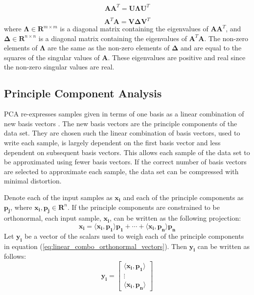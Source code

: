 \documentclass[conference]{IEEEtran}
\begin{document}
    \begin{equation}
         \mathbf{AA}^{T} = \mathbf{U\Lambda}\mathbf{U}^T
    \label{eq:aatranspose}
    \end{equation}

    \begin{equation}
         \mathbf{A}^T\mathbf{A} = \mathbf{V\Delta}\mathbf{V}^T
    \label{eq:atransposea}
    \end{equation}
    where $\mathbf{\Lambda} \in \mathbf{R}^{m \times m}$ is a diagonal matrix containing the eigenvalues of $\mathbf{AA}^{T}$, and $\mathbf{\Delta} \in \mathbf{R}^{n \times n}$ is a diagonal matrix containing the eigenvalues of $\mathbf{A}^T\mathbf{A}$. The non-zero elements of $\mathbf{\Lambda}$ are the same as the non-zero elements of $\mathbf{\Delta}$ and are equal to the squares of the singular values of $\mathbf{A}$. These eigenvalues are positive and real since the non-zero singular values are real.
    
    \subsection{Principle Component Analysis}
    
    PCA re-expresses samples given in terms of one basis as a linear combination of new basis vectors \cite{shlens_2014_tutorial}. The new basis vectors are the principle components of the data set. They are chosen such the linear combination of basis vectors, used to write each sample, is largely dependent on the first basis vector and less dependent on subsequent basis vectors. This allows each sample of the data set to be approximated using fewer basis vectors. If the correct number of basis vectors are selected to approximate each sample, the data set can be compressed with minimal distortion.
    
    Denote each of the input samples as $\mathbf{x_i}$ and each of the principle components as $\mathbf{p_j}$, where $\mathbf{x_i}, \mathbf{p_j} \in \mathbf{R}^{n}$. If the principle components are constrained to be orthonormal, each input sample, $\mathbf{x_i}$, can be written as the following projection:
    \begin{equation}
    		\mathbf{x_i} = \langle \mathbf{x_i}, \mathbf{p_1} \rangle \mathbf{p_1} + \cdots + \langle \mathbf{x_i}, \mathbf{p_n} \rangle \mathbf{p_n}
    \label{eq:linear_combo_orthonormal_vectors}
    \end{equation}
    Let $\mathbf{y_i}$ be a vector of the scalars used to weigh each of the principle components in equation (\ref{eq:linear_combo_orthonormal_vectors}). Then $\mathbf{y_i}$ can be written as follows:
    	\begin{equation}
        \mathbf{y_i} = \begin{bmatrix}
                        \langle \mathbf{x_i}, \mathbf{p_1} \rangle\\
                        \vdots \\
                        \langle \mathbf{x_i}, \mathbf{p_n}\rangle
                        \end{bmatrix}
    \end{equation}
    
\end{document}
